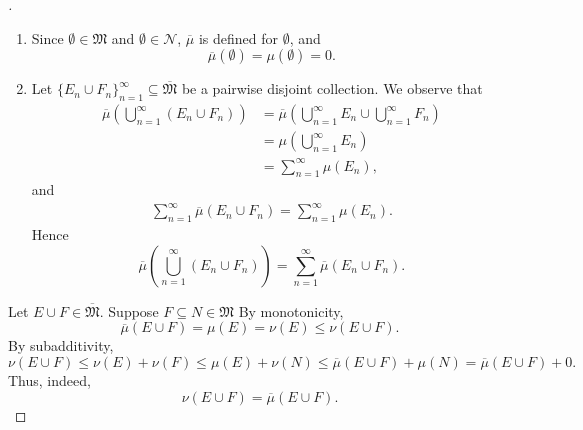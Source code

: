 \documentclass[notoc,notitlepage]{tufte-book}
\begin{document}
\begin{proof}[]
  \noindent
  \begin{enumerate}
    \item Since $\emptyset \in \mathfrak{M}$ and $\emptyset \in \mathcal{N}$,
      $\overline{\mu}$ is defined for $\emptyset$, and
      \begin{equation*}
        \overline{\mu}(\emptyset) = \mu(\emptyset) = 0.
      \end{equation*}
    \item Let $\{ E_n \cup F_n \}_{n=1}^{\infty}
      \subseteq \overline{\mathfrak{M}}$ be a pairwise disjoint collection.
      We observe that
      \begin{align*}
        \overline{\mu} \left( \bigcup_{n=1}^{\infty} (E_n \cup F_n) \right)
        &= \overline{\mu} \left( \bigcup_{n=1}^{\infty} E_n \cup
          \bigcup_{n=1}^{\infty} F_n \right) \\
        &= \mu \left( \bigcup_{n=1}^{\infty} E_n \right) \\
        &= \sum_{n=1}^{\infty} \mu(E_n),
      \end{align*}
      and
      \begin{align*}
        \sum_{n=1}^{\infty} \overline{\mu} (E_n \cup F_n)
        = \sum_{n=1}^{\infty} \mu(E_n).
      \end{align*}
      Hence
      \begin{equation*}
        \overline{\mu} \left( \bigcup_{n=1}^{\infty} (E_n \cup F_n) \right)
        = \sum_{n=1}^{\infty} \overline{\mu} (E_n \cup F_n).
      \end{equation*}
  \end{enumerate}

  \noindent
  \hlbnoted{$\nu = \overline{\mu}$}
  Let $E \cup F \in \overline{\mathfrak{M}}$.
  Suppose $F \subseteq N \in \mathfrak{M}$
  By monotonicity,
  \begin{equation*}
    \overline{\mu}(E \cup F) = \mu(E) = \nu(E) \leq \nu(E \cup F).
  \end{equation*}
  By subadditivity,
  \begin{equation*}
    \nu(E \cup F)
    \leq \nu(E) + \nu(F)
    \leq \mu(E) + \nu(N)
    \leq \overline{\mu}(E \cup F) + \mu(N)
    = \overline{\mu}(E \cup F) + 0.
  \end{equation*}
  Thus, indeed,
  \begin{equation*}
    \nu(E \cup F) = \overline{\mu}(E \cup F).
  \end{equation*}
\end{proof}
\end{document}
